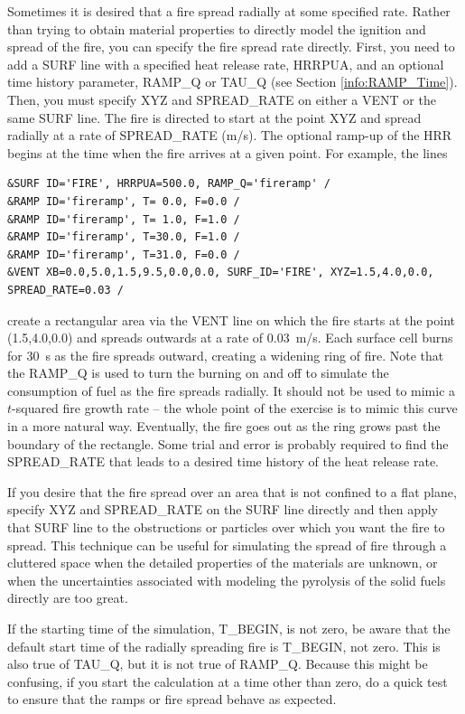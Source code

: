 \documentclass[11pt]{book}
\begin{document}
Sometimes it is desired that a fire spread radially at some specified rate. Rather than trying to obtain material properties to directly model the ignition and spread of the fire, you can specify the fire spread rate directly. First, you need to add a {\ct SURF} line with a specified heat release rate, {\ct HRRPUA}, and an optional time history parameter, {\ct RAMP\_Q} or {\ct TAU\_Q} (see Section \ref{info:RAMP_Time}). Then, you must specify {\ct XYZ} and {\ct SPREAD\_RATE} on either a {\ct VENT} or the same {\ct SURF} line. The fire is directed to start at the point {\ct XYZ} and spread radially at a rate of {\ct SPREAD\_RATE} (m/s). The optional ramp-up of the HRR begins at the time when the fire arrives at a given point. For example, the lines
\begin{lstlisting}
&SURF ID='FIRE', HRRPUA=500.0, RAMP_Q='fireramp' /
&RAMP ID='fireramp', T= 0.0, F=0.0 /
&RAMP ID='fireramp', T= 1.0, F=1.0 /
&RAMP ID='fireramp', T=30.0, F=1.0 /
&RAMP ID='fireramp', T=31.0, F=0.0 /
&VENT XB=0.0,5.0,1.5,9.5,0.0,0.0, SURF_ID='FIRE', XYZ=1.5,4.0,0.0, SPREAD_RATE=0.03 /
\end{lstlisting}
create a rectangular area via the {\ct VENT} line on which the fire starts at the point (1.5,4.0,0.0) and spreads outwards at a rate of 0.03~m/s. Each surface cell burns for 30~s as the fire spreads outward, creating a widening ring of fire. Note that the {\ct RAMP\_Q} is used to turn the burning on and off to simulate the consumption of fuel as the fire spreads radially. It should not be used to mimic a $t$-squared fire growth rate -- the whole point of the exercise is to mimic this curve in a more natural way. Eventually, the fire goes out as the ring grows past the boundary of the rectangle. Some trial and error is probably required to find the {\ct SPREAD\_RATE} that leads to a desired time history of the heat release rate.

If you desire that the fire spread over an area that is not confined to a flat plane, specify {\ct XYZ} and {\ct SPREAD\_RATE} on the {\ct SURF} line directly and then apply that {\ct SURF} line to the obstructions or particles over which you want the fire to spread. This technique can be useful for simulating the spread of fire through a cluttered space when the detailed properties of the materials are unknown, or when the uncertainties associated with modeling the pyrolysis of the solid fuels directly are too great.


If the starting time of the simulation, {\ct T\_BEGIN}, is not zero, be aware that the default start time of the radially spreading fire is {\ct T\_BEGIN}, not zero. This is also true of {\ct TAU\_Q}, but it is not true of {\ct RAMP\_Q}. Because this might be confusing, if you start the calculation at a time other than zero, do a quick test to ensure that the ramps or fire spread behave as expected.
\end{document}
